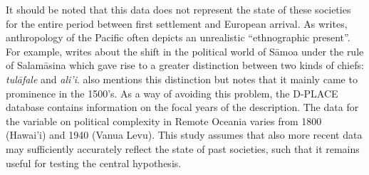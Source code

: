 \documentclass[12pt,letterpaper]{article}
\begin{document}



It should be noted that this data does not represent the state of these societies for the entire period between first settlement and European arrival. As \citet{meleisea1995} writes, anthropology of the Pacific often depicts an unrealistic ``ethnographic present''. For example, \citet[185]{schoeffel87} writes about the shift in the political world of S\={a}moa under the rule of Salam\={a}sina which gave rise to a greater distinction between two kinds of chiefs: \emph{tul\={a}fale} and \emph{ali'i}. \citet[249]{kirch2017road} also mentions this distinction but notes that it mainly came to prominence in the 1500's. As a way of avoiding this problem, the D-PLACE database \citep{d_place_all} contains information on the focal years of the description. The data for the variable on political complexity in Remote Oceania varies from 1800 (Hawai'i) and 1940 (Vanua Levu). This study assumes that also more recent data may sufficiently accurately reflect the state of past societies, such that it remains useful for testing the central hypothesis.
\end{document}
